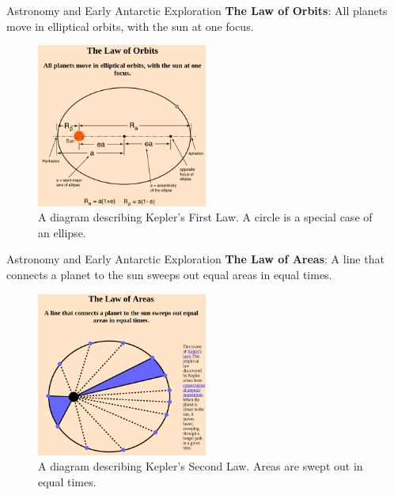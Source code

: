 \documentclass{beamer}
\begin{document}
\begin{frame}{Astronomy and Early Antarctic Exploration}
\small
\textbf{The Law of Orbits}: All planets move in elliptical orbits, with the sun at one focus.
\begin{figure}
\centering
\includegraphics[width=0.5\textwidth]{figures/orbit1.png}
\caption{\label{fig:orbit1} A diagram describing Kepler's First Law.  A circle is a special case of an ellipse.}
\end{figure}
\end{frame}

\begin{frame}{Astronomy and Early Antarctic Exploration}
\small
\textbf{The Law of Areas}: A line that connects a planet to the sun sweeps out equal areas in equal times.
\begin{figure}
\centering
\includegraphics[width=0.5\textwidth]{figures/orbit2.png}
\caption{\label{fig:orbit2} A diagram describing Kepler's Second Law.  Areas are swept out in equal times.}
\end{figure}
\end{frame}
\end{document}
